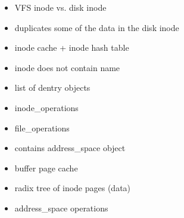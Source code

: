 \documentclass[30pt,a4paper,landscape,headrule,footrule]{foils}
\begin{document}


\begin{itemize}
\item VFS inode vs. disk inode
\item duplicates some of the data in the disk inode
\item inode cache + inode hash table
\item inode does not contain name
\item list of dentry objects
\item inode\_operations
\item file\_operations
\end{itemize}

\begin{itemize}
\item contains address\_space object
\item buffer page cache
\item radix tree of inode pages (data)
\item address\_space operations
\end{itemize}
\end{document}
